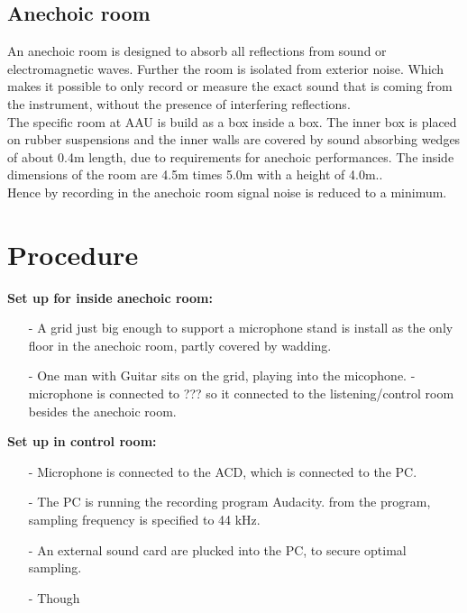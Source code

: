 \subsection{Anechoic room} 
An anechoic room is designed to absorb all reflections from sound or electromagnetic waves. Further the room is isolated from exterior noise. Which makes it possible to only record or measure the exact sound that is coming from the instrument, without the presence of interfering reflections. \\ The specific room at AAU is build as a box inside a box. The inner box is placed on rubber suspensions and the inner walls are covered by sound absorbing wedges of about 0.4m length, due to requirements for anechoic performances. The inside dimensions of the room are 4.5m times 5.0m with a height of 4.0m.\cite{anechoic}.\\
Hence by recording in the anechoic room signal noise is reduced to a minimum.

\section{Procedure}
\textbf{Set up for inside anechoic room:}\\
\begin{itemize}
\item[-] A grid just big enough to support a microphone stand is install as the only floor in the anechoic room, partly covered by wadding. 
\item[-] One man with Guitar sits on the grid, playing into the micophone. 
- microphone is connected to ???  so it connected to the listening/control room besides the anechoic room. 
\end{itemize}   
\textbf{Set up in control room: }
\begin{itemize}
\item[-] Microphone is connected to the ACD, which is connected to the PC.
\item[-] The PC is running the recording program Audacity. from the program, sampling frequency is specified to 44 kHz.
\item[-] An external sound card are plucked into the PC, to secure optimal sampling.  
\item[-] Though      
\end{itemize}

